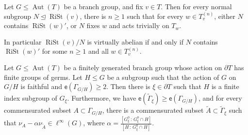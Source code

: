 \documentclass[10pt,a4paper]{amsart}
\newcommand{\Gammatilde}{\ensuremath{\widetilde{\Gamma}}}%
\newcommand{\aut}{\ensuremath{\operatorname{Aut}}}%
\newcommand{\esf}{\ensuremath{\mathsf{e}}}
\newcommand{\rist}{\ensuremath{\operatorname{RiSt}}}%
\begin{document}
\begin{lemma} \label{l-quotient-rist}
    Let $G\le \aut(T)$ be a branch group, and fix $v\in T$. Then for every normal subgroup $N\unlhd \rist(v)$, there is $n\ge 1$ such that for every  $w\in T^{(n)}_v$, either $N$ contains $\rist(w)'$, or $N$ fixes $w$ and acts trivially on $T_w$.

    In particular $\rist(v)/N$ is virtually abelian if and only if $N$ contains $\rist(w)'$ for some $n\ge 1$ and all $w\in T^{(n)}_v$. 
\end{lemma}

\begin{thm} \label{t-multi-ended-graphs}
Let $G\le \aut(T)$ be a finitely generated branch group whose action on $\partial T$ has finite groups of germs.
Let $H\le G$ be a subgroup such that the action of $G$ on $G/H$ is faithful and $\esf(\Gamma_{G/H})\ge 2$. Then there is $\xi \in \partial T$ such that $H$ is a finite index subgroup of $G_\xi$. Furthermore, we have $\esf(\Gammatilde_\xi)\ge \esf(\Gamma_{G/H})$, and for every commensurated subset $A\subset \Gamma_{G/H}$, there is a commensurated subset $\widetilde{A}\subset \Gammatilde_
\xi$ such that $\nu_A-\alpha\nu_{\widetilde{A}}\in \ell^\infty(G)$, where $\alpha=\frac{[G^0_\xi\,  :\,  G^0_\xi\cap H]}{[H\, : \, G^0_\xi\cap H]}$.



\end{thm}
\end{document}
